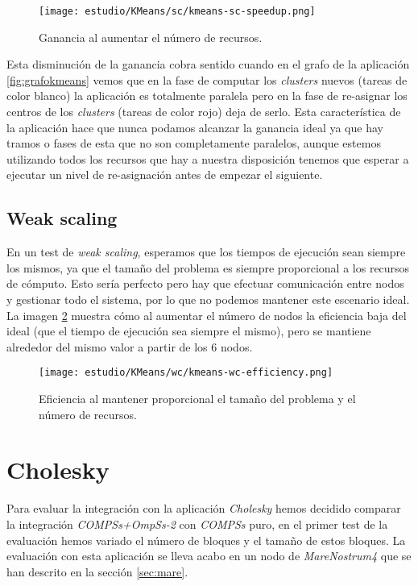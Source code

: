 \begin{figure}[H]
	\centering 
	\caption{Ganancia al aumentar el número de recursos.}
	\texttt{[image: estudio/KMeans/sc/kmeans-sc-speedup.png]}
	\label{fig:sc-speedup}
\end{figure}
 
Esta disminución de la ganancia cobra sentido cuando en el grafo de la aplicación \ref{fig:grafokmeans} vemos que en la fase de computar los \textit{clusters} nuevos (tareas de color blanco) la aplicación es totalmente paralela pero en la fase de re-asignar los centros de los \textit{clusters} (tareas de color rojo) deja de serlo. Esta característica de la aplicación hace que nunca podamos alcanzar la ganancia ideal ya que hay tramos o fases de esta que no son completamente paralelos, aunque estemos utilizando todos los recursos que hay a nuestra disposición tenemos que esperar a ejecutar un nivel de re-asignación antes de empezar el siguiente. 

\subsection{Weak scaling}

En un test de \textit{weak scaling}, esperamos que los tiempos de ejecución sean siempre los mismos, ya que el tamaño del problema es siempre proporcional a los recursos de cómputo. Esto sería perfecto pero hay que efectuar comunicación entre nodos y gestionar todo el sistema, por lo que no podemos mantener este escenario ideal. La imagen \ref{fig:wc-effic} muestra cómo al aumentar el número de nodos la eficiencia baja del ideal (que el tiempo de ejecución sea siempre el mismo), pero se mantiene alrededor del mismo valor a partir de los 6 nodos.

\begin{figure}[H]
	\centering 
	\caption{Eficiencia al mantener proporcional el tamaño del problema y el número de recursos.}
	\texttt{[image: estudio/KMeans/wc/kmeans-wc-efficiency.png]}
	\label{fig:wc-effic}
\end{figure}

\section{Cholesky}

Para evaluar la integración con la aplicación \textit{Cholesky} hemos decidido comparar la integración \textit{COMPSs+OmpSs-2} con \textit{COMPSs} puro, en el primer test de la evaluación hemos variado el número de bloques y el tamaño de estos bloques. La evaluación con esta aplicación se lleva acabo en un nodo de \textit{MareNostrum4} que se han descrito en la sección \ref{sec:mare}.

